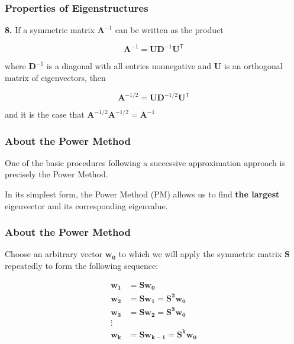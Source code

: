 \documentclass[12pt]{beamer}\usepackage[]{graphicx}\usepackage[]{color}
\begin{document}

\begin{frame}
\frametitle{Properties of Eigenstructures}

{\mdlit \textbf{8.}} If a symmetric matrix $\mathbf{A}^{-1}$ can be written as the
product

$$
\mathbf{A}^{-1} = \mathbf{UD}^{-1} \mathbf{U}^\mathsf{T}
$$

where $\mathbf{D}^{-1}$ is a diagonal with all entries nonnegative and $\mathbf{U}$
is an orthogonal matrix of eigenvectors, then 

$$
\mathbf{A}^{-1/2} = \mathbf{UD}^{-1/2} \mathbf{U}^\mathsf{T}
$$

and it is the case that $\mathbf{A}^{-1/2} \mathbf{A}^{-1/2} = \mathbf{A}^{-1}$

\end{frame}


\begin{frame}
\begin{center}
\Huge{}
\end{center}
\end{frame}


\begin{frame}
\frametitle{About the Power Method}

One of the basic procedures following a successive approximation 
approach is precisely the {\hilit Power Method}.

\bigskip
In its simplest form, the Power Method (PM) allows us to find \textbf{the largest} 
eigenvector and its corresponding eigenvalue.

\end{frame}


\begin{frame}
\frametitle{About the Power Method}

Choose an arbitrary vector $\mathbf{w_0}$ to which we will apply the symmetric matrix 
$\mathbf{S}$ repeatedly to form the following sequence:

\begin{align*}
 \mathbf{w_1} &= \mathbf{S w_0} \\
 \mathbf{w_2} &= \mathbf{S w_1 = S^2 w_0} \\
 \mathbf{w_3} &= \mathbf{S w_2 = S^3 w_0} \\
 \vdots \\
 \mathbf{w_k} &= \mathbf{S w_{k-1} = S^k w_0}
\end{align*}

\end{frame}
\end{document}
